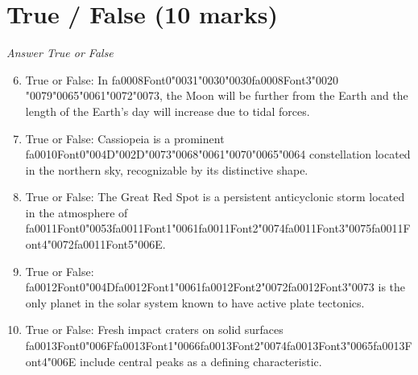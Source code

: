 \documentclass[12pt]{article}
\begin{document}
\section*{True / False (10 marks)}
\textit{Answer True or False}
\begin{enumerate}[label=\arabic*.]
\setcounter{enumi}{5}
\item True or False: In {\csname fa0008Font0\endcsname\char"0031}{\char"0030}{\char"0030}{\csname fa0008Font3\endcsname\char"0020} {\char"0079}{\char"0065}{\char"0061}{\char"0072}{\char"0073}, the Moon will be further from the Earth and the length of the Earth's day will increase due to tidal forces.
\item True or False: Cassiopeia is a prominent {\csname fa0010Font0\endcsname\char"004D}{\char"002D}{\char"0073}{\char"0068}{\char"0061}{\char"0070}{\char"0065}{\char"0064} constellation located in the northern sky, recognizable by its distinctive shape.
\item True or False: The Great Red Spot is a persistent anticyclonic storm located in the atmosphere of {\csname fa0011Font0\endcsname\char"0053}{\csname fa0011Font1\endcsname\char"0061}{\csname fa0011Font2\endcsname\char"0074}{\csname fa0011Font3\endcsname\char"0075}{\csname fa0011Font4\endcsname\char"0072}{\csname fa0011Font5\endcsname\char"006E}.
\item True or False: {\csname fa0012Font0\endcsname\char"004D}{\csname fa0012Font1\endcsname\char"0061}{\csname fa0012Font2\endcsname\char"0072}{\csname fa0012Font3\endcsname\char"0073} is the only planet in the solar system known to have active plate tectonics.
\item True or False: Fresh impact craters on solid surfaces {\csname fa0013Font0\endcsname\char"006F}{\csname fa0013Font1\endcsname\char"0066}{\csname fa0013Font2\endcsname\char"0074}{\csname fa0013Font3\endcsname\char"0065}{\csname fa0013Font4\endcsname\char"006E} include central peaks as a defining characteristic.
\end{enumerate}
\end{document}
